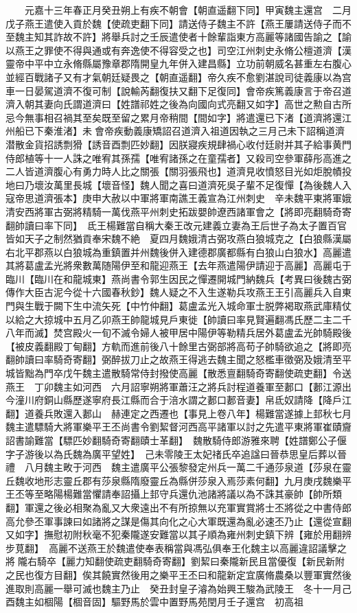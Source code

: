 　　元嘉十三年春正月癸丑朔上有疾不朝會【朝直遥翻下同】甲寅魏主還宫　二月戊子燕王遣使入貢於魏【使疏吏翻下同】請送侍子魏主不許【燕王屢請送侍子而不至魏主知其詐故不許】將舉兵討之壬辰遣使者十餘輩詣東方高麗等諸國告諭之【諭以燕王之罪使不得與通或有奔逸使不得容受之也】司空江州刺史永脩公檀道濟【漢靈帝中平中立永脩縣屬豫章郡隋開皇九年併入建昌縣】立功前朝威名甚重左右腹心並經百戰諸子又有才氣朝廷疑畏之【朝直遥翻】帝久疾不愈劉湛說司徒義康以為宫車一日晏駕道濟不復可制【說輸芮翻復扶又翻下足復同】會帝疾篤義康言于帝召道濟入朝其妻向氏謂道濟曰【姓譜祁姓之後為向國向式亮翻又如字】高世之勲自古所忌今無事相召禍其至矣既至留之累月帝稍間【間如字】將遣還已下渚【道濟將還江州船已下秦淮渚】未會帝疾動義康矯詔召道濟入祖道因執之三月己未下詔稱道濟潜散金貨招誘剽猾【誘音酉剽匹妙翻】因朕寢疾規肆禍心收付廷尉并其子給事黄門侍郎植等十一人誅之唯宥其孫孺【唯宥諸孫之在童孺者】又殺司空參軍薛彤高進之二人皆道濟腹心有勇力時人比之關張【關羽張飛也】道濟見收憤怒目光如炬脫幘投地曰乃壞汝萬里長城【壞音怪】魏人聞之喜曰道濟死吳子輩不足復憚【為後魏人入寇帝思道濟張本】庚申大赦以中軍將軍南譙王義宣為江州刺史　辛未魏平東將軍娥清安西將軍古弼將精騎一萬伐燕平州刺史拓跋嬰帥遼西諸軍會之【將即亮翻騎奇寄翻帥讀曰率下同】　氐王楊難當自稱大秦王改元建義立妻為王后世子為太子置百官皆如天子之制然猶貢奉宋魏不絶　夏四月魏娥清古弼攻燕白狼城克之【白狼縣漢屬右北平郡燕以白狼城為重鎮置并州魏後併入建德郡廣都縣有白狼山白狼水】高麗遣其將葛盧孟光將衆數萬随陽伊至和龍迎燕王【去年燕遣陽伊請迎于高麗】高麗屯于臨川【臨川在和龍城東】燕尚書令郭生因民之憚遷開城門納魏兵【考異曰後魏古弼傳作大臣古泥今從十六國春秋鈔】魏人疑之不入生遂勒兵攻燕王王引高麗兵入自東門與生戰于闕下生中流矢死【中竹仲翻】葛盧孟光入城命軍士脱弊褐取燕武庫精仗以給之大掠城中五月乙卯燕王帥龍城見戶東徙【帥讀曰率見賢遍翻馮氏歷二主二千八年而滅】焚宫殿火一旬不滅令婦人被甲居中陽伊等勒精兵居外葛盧孟光帥騎殿後【被皮義翻殿丁甸翻】方軌而進前後八十餘里古弼部將高苟子帥騎欲追之【將即亮翻帥讀曰率騎奇寄翻】弼醉拔刀止之故燕王得逃去魏主聞之怒檻車徵弼及娥清至平城皆黜為門卒戊午魏主遣散騎常侍封撥使高麗【散悉亶翻騎奇寄翻使疏吏翻】令送燕王　丁卯魏主如河西　六月詔寧朔將軍蕭汪之將兵討程道養軍至郪口【郪江源出今潼川府銅山縣歷遂寧府長江縣而合于涪水謂之郪口郪音妻】帛氐奴請降【降戶江翻】道養兵敗還入郪山　赫連定之西遷也【事見上卷八年】楊難當遂據上邽秋七月魏主遣驃騎大將軍樂平王丕尚書令劉絜督河西高平諸軍以討之先遣平東將軍崔賾齎詔書諭難當【驃匹妙翻騎奇寄翻賾士革翻】　魏散騎侍郎游雅來聘【姓譜鄭公子偃字子游後以為氏魏為廣平望姓】　己未零陵王太妃禇氏卒追諡曰晉恭思皇后葬以晉禮　八月魏主畋于河西　魏主遣廣平公張黎發定州兵一萬二千通莎泉道【莎泉在靈丘魏收地形志靈丘郡有莎泉縣隋廢靈丘為縣併莎泉入焉莎素何翻】九月庚戌魏樂平王丕等至略陽楊難當懼請奉詔攝上邽守兵還仇池諸將議以為不誅其豪帥【帥所類翻】軍還之後必相聚為亂又大衆遠出不有所掠無以充軍實賞將士丕將從之中書侍郎高允參丕軍事諫曰如諸將之謀是傷其向化之心大軍既還為亂必速丕乃止【還從宣翻又如字】撫慰初附秋毫不犯秦隴遂安難當以其子順為雍州刺史鎮下辨【雍於用翻辨步莧翻】　高麗不送燕王於魏遣使奉表稱當與馮弘俱奉王化魏主以高麗違詔議擊之將隴右騎卒【麗力知翻使疏吏翻騎奇寄翻】劉絜曰秦隴新民且當優復【新民新附之民也復方目翻】俟其饒實然後用之樂平王丕曰和龍新定宜廣脩農桑以豐軍實然後進取則高麗一舉可滅也魏主乃止　癸丑封皇子濬為始興王駿為武陵王　冬十一月己酉魏主如棝陽【棝音固】驅野馬於雲中置野馬苑閏月壬子還宫　初高祖